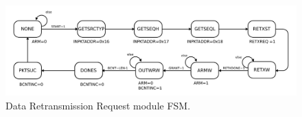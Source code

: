\begin{figure}
\begin{centering}
\includegraphics[scale=0.8]{dataretxresponse.fsm.svg}
\end{centering}
\caption{Data Retransmission Request module FSM.}
\label{dataretxresponse.fsm}
\end{figure}
